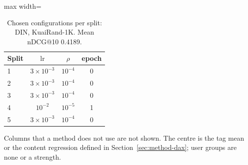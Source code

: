 \begin{table}[tbp]
\centering
\footnotesize
\caption{Chosen configurations per split: DIN, KuaiRand-1K. Mean nDCG@10 0.4189.}
\label{tab:grid14}
\begin{adjustbox}{max width=\linewidth}
\begin{tabular}{lccc}
\toprule
Split & $\mathrm{lr}$ & $\rho$ & epoch \\
\midrule
1 & $3\times10^{-3}$ & $10^{-4}$ & 0 \\
2 & $3\times10^{-3}$ & $10^{-4}$ & 0 \\
3 & $3\times10^{-3}$ & $10^{-4}$ & 0 \\
4 & $10^{-2}$ & $10^{-5}$ & 1 \\
5 & $3\times10^{-3}$ & $10^{-4}$ & 0 \\
\bottomrule
\end{tabular}
\end{adjustbox}
\par\smallskip
\begin{minipage}{\linewidth}\raggedright\footnotesize Columns that a method does not use are not shown. The centre is the tag mean or the content regression defined in Section~\ref{sec:method-dax}; user groups are none or a strength.\end{minipage}
\end{table}
